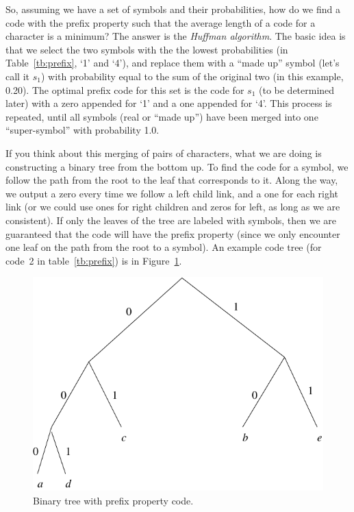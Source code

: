 So, assuming we have a set of symbols and their probabilities, how do
we find a code with the prefix property such that the average length
of a code for a character is a minimum? The answer is the
\emph{Huffman algorithm}. The basic idea is that we select the two
symbols with the the lowest probabilities (in Table~\ref{tb:prefix},
`1' and `4'), and replace them with a ``made up'' symbol (let's call
it $s_1$) with probability equal to the sum of the original two (in
this example, 0.20).  The optimal prefix code for this set is the code
for $s_1$ (to be determined later) with a zero appended for `1' and a
one appended for `4'. This process is repeated, until all symbols
(real or ``made up'') have been merged into one ``super-symbol'' with
probability 1.0.

If you think about this merging of pairs of characters, what we are
doing is constructing a binary tree from the bottom up.  To find the
code for a symbol, we follow the path from the root to the leaf that
corresponds to it.  Along the way, we output a zero every time we
follow a left child link, and a one for each right link (or we could
use ones for right children and zeros for left, as long as we are
consistent).  If only the leaves of the tree are labeled with symbols,
then we are guaranteed that the code will have the prefix property
(since we only encounter one leaf on the path from the root to a
symbol).  An example code tree (for code~2 in table~\ref{tb:prefix})
is in Figure~\ref{fg:code-tree}.

\begin{figure}
\centerline{\includegraphics[width=\textwidth]{ch-comp/huffman-tree}}
\caption{Binary tree with prefix property code.\label{fg:code-tree}}
\end{figure}

